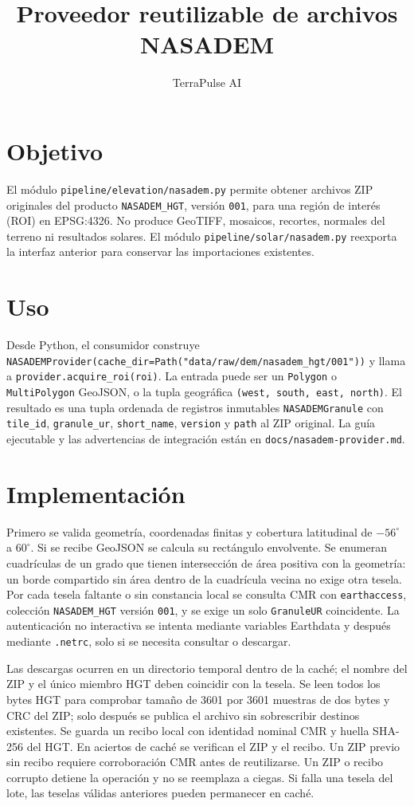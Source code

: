 \documentclass[11pt]{article}
\title{Proveedor reutilizable de archivos NASADEM}
\author{TerraPulse AI}
\date{}
\begin{document}
\maketitle

\section{Objetivo}
El módulo \texttt{pipeline/elevation/nasadem.py} permite obtener archivos ZIP originales del producto \texttt{NASADEM\_HGT}, versión \texttt{001}, para una región de interés (ROI) en EPSG:4326. No produce GeoTIFF, mosaicos, recortes, normales del terreno ni resultados solares. El módulo \texttt{pipeline/solar/nasadem.py} reexporta la interfaz anterior para conservar las importaciones existentes.

\section{Uso}
Desde Python, el consumidor construye \texttt{NASADEMProvider(cache\_dir=Path("data/raw/dem/nasadem\_hgt/001"))} y llama a \texttt{provider.acquire\_roi(roi)}. La entrada puede ser un \texttt{Polygon} o \texttt{MultiPolygon} GeoJSON, o la tupla geográfica \texttt{(west, south, east, north)}. El resultado es una tupla ordenada de registros inmutables \texttt{NASADEMGranule} con \texttt{tile\_id}, \texttt{granule\_ur}, \texttt{short\_name}, \texttt{version} y \texttt{path} al ZIP original. La guía ejecutable y las advertencias de integración están en \texttt{docs/nasadem-provider.md}.

\section{Implementación}
Primero se valida geometría, coordenadas finitas y cobertura latitudinal de \(-56^\circ\) a \(60^\circ\). Si se recibe GeoJSON se calcula su rectángulo envolvente. Se enumeran cuadrículas de un grado que tienen intersección de área positiva con la geometría: un borde compartido sin área dentro de la cuadrícula vecina no exige otra tesela. Por cada tesela faltante o sin constancia local se consulta CMR con \texttt{earthaccess}, colección \texttt{NASADEM\_HGT} versión \texttt{001}, y se exige un solo \texttt{GranuleUR} coincidente. La autenticación no interactiva se intenta mediante variables Earthdata y después mediante \texttt{.netrc}, solo si se necesita consultar o descargar.

Las descargas ocurren en un directorio temporal dentro de la caché; el nombre del ZIP y el único miembro HGT deben coincidir con la tesela. Se leen todos los bytes HGT para comprobar tamaño de 3601 por 3601 muestras de dos bytes y CRC del ZIP; solo después se publica el archivo sin sobrescribir destinos existentes. Se guarda un recibo local con identidad nominal CMR y huella SHA-256 del HGT. En aciertos de caché se verifican el ZIP y el recibo. Un ZIP previo sin recibo requiere corroboración CMR antes de reutilizarse. Un ZIP o recibo corrupto detiene la operación y no se reemplaza a ciegas. Si falla una tesela del lote, las teselas válidas anteriores pueden permanecer en caché.
\end{document}
